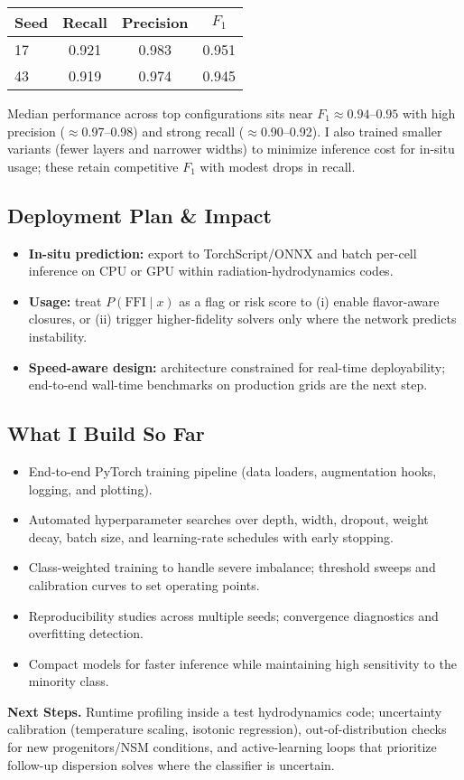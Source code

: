 \documentclass[10pt]{article}
\begin{document}
\begin{center}
\begin{center}
\begin{tabular}{@{}lccc@{}}
\toprule
Seed & Recall & Precision & $F_1$ \\\midrule
17 & 0.921 & 0.983 & 0.951 \\
43 & 0.919 & 0.974 & 0.945 \\
\bottomrule
\end{tabular}
\end{center}

Median performance across top configurations sits near $F_1 \approx 0.94$--$0.95$ with high precision ($\approx$0.97--0.98) and strong recall ($\approx$0.90--0.92).
I also trained smaller variants (fewer layers and narrower widths) to minimize inference cost for in-situ usage; these retain competitive $F_1$ with modest drops in recall.

\subsection*{Deployment Plan \& Impact}
\begin{itemize}
  \item \textbf{In-situ prediction:} export to TorchScript/ONNX and batch per-cell inference on CPU or GPU within radiation-hydrodynamics codes.
  \item \textbf{Usage:} treat $P(\mathrm{FFI}\mid x)$ as a flag or risk score to (i) enable flavor-aware closures, or (ii) trigger higher-fidelity solvers only where the network predicts instability.
  \item \textbf{Speed-aware design:} architecture constrained for real-time deployability; end-to-end wall-time benchmarks on production grids are the next step.
\end{itemize}

\subsection*{What I Build So Far}
\begin{itemize}
  \item End-to-end PyTorch training pipeline (data loaders, augmentation hooks, logging, and plotting).
  \item Automated hyperparameter searches over depth, width, dropout, weight decay, batch size, and learning-rate schedules with early stopping.
  \item Class-weighted training to handle severe imbalance; threshold sweeps and calibration curves to set operating points.
  \item Reproducibility studies across multiple seeds; convergence diagnostics and overfitting detection.
  \item Compact models for faster inference while maintaining high sensitivity to the minority class.
\end{itemize}

\textbf{Next Steps.}
Runtime profiling inside a test hydrodynamics code; uncertainty calibration (temperature scaling, isotonic regression), out-of-distribution checks for new progenitors/NSM conditions, and active-learning loops that prioritize follow-up dispersion solves where the classifier is uncertain.
\end{center}
\end{document}
